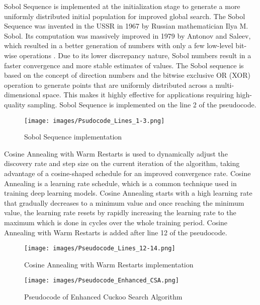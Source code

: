 \documentclass{article}
\begin{document}
Sobol Sequence is implemented at the initialization stage to generate a more uniformly distributed initial population for improved global search. The Sobol Sequence was invented in the USSR in 1967 by Russian mathematician Ilya M. Sobol. Its computation was massively improved in 1979 by Antonov and Saleev, which resulted in a better generation of numbers with only a few low-level bit-wise operations \cite{sirsant2022improved}. Due to its lower discrepancy nature, Sobol numbers result in a faster convergence and more stable estimates of values. The Sobol sequence is based on the concept of direction numbers and the bitwise exclusive OR (XOR) operation to generate points that are uniformly distributed across a multi-dimensional space. This makes it highly effective for applications requiring high-quality sampling. Sobol Sequence is implemented on the line 2 of the pseudocode.

\begin{figure}[htbp]
    \centering
    \texttt{[image: images/Psudocode\_Lines\_1-3.png]}
    \caption{Sobol Sequence implementation}
    \label{fig:sobol sequence implementation}
\end{figure}

Cosine Annealing with Warm Restarts is used to dynamically adjust the discovery rate and step size on the current iteration of the algorithm, taking advantage of a cosine-shaped schedule for an improved convergence rate. Cosine Annealing is a learning rate schedule, which is a common technique used in training deep learning models. Cosine Annealing starts with a high learning rate that gradually decreases to a minimum value and once reaching the minimum value, the learning rate resets by rapidly increasing the learning rate to the maximum which is done in cycles over the whole training period. Cosine Annealing with Warm Restarts is added after line 12 of the pseudocode.

\begin{figure}[htbp]
    \centering
    \texttt{[image: images/Pseudocode\_Lines\_12-14.png]}
    \caption{Cosine Annealing with Warm Restarts implementation}
    \label{fig:cosine annealing implementation}
\end{figure}

\begin{figure}[H]
    \centering
    \texttt{[image: images/Pseudocode\_Enhanced\_CSA.png]}
    \caption{Pseudocode of Enhanced Cuckoo Search Algorithm}
    \label{fig:ecsa pseudocode}
\end{figure}
\end{document}
